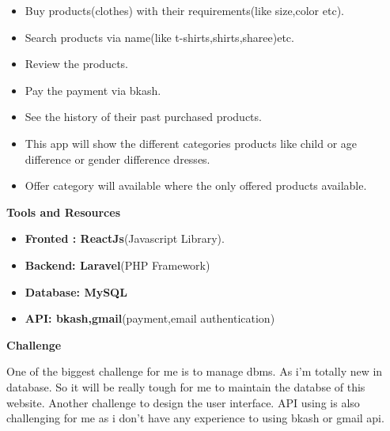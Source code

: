 \documentclass{article}
\begin{document}
\linebreak
\begin{itemize}
    \item Buy products(clothes) with their requirements(like size,color etc).
    \item Search products via name(like t-shirts,shirts,sharee)etc.
    \item Review the products.
    \item Pay the payment via bkash.
    \item See the history of their past purchased products.
    \item This app will show the different categories products like child or age difference or gender difference dresses.
    \item Offer category will available where the only offered products available.
\end{itemize}
\linebreak
\huge\textbf{Tools and Resources}

\begin{itemize}
    \LARGE\item \textbf{Fronted : ReactJs}\large{(Javascript Library)}.
    \LARGE\item \textbf{Backend: Laravel}\large{(PHP Framework)}
    \LARGE\item \textbf{Database: MySQL}
    \LARGE\item \textbf{API: bkash,gmail}\large{(payment,email authentication)}
\end{itemize}
\linebreak
\huge\textbf{Challenge}

\linebreak
\justify\Large{One of the biggest challenge for me is to manage dbms. As i'm totally new in database. So it will be really tough for me to maintain the databse of this website. Another challenge to design the user interface. API using is also challenging for me as i don't have any experience to using bkash or gmail api. }
\end{document}
